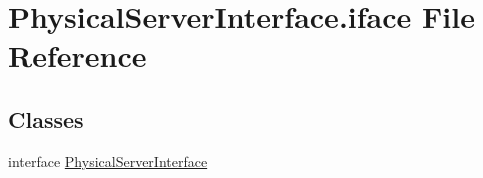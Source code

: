\hypertarget{PhysicalServerInterface_8iface}{\section{Physical\-Server\-Interface.\-iface File Reference}
\label{PhysicalServerInterface_8iface}
}
\subsection*{Classes}
\begin{DoxyCompactItemize}
\item 
interface \hyperlink{interfacePhysicalServerInterface}{Physical\-Server\-Interface}
\end{DoxyCompactItemize}
